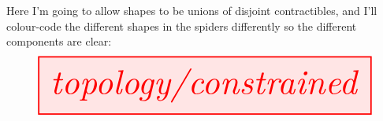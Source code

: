 \begin{example}
Here I'm going to allow shapes to be unions of disjoint contractibles, and I'll colour-code the different shapes in the spiders differently so the different components are clear:
\[\resizebox{\textwidth}{!}{\tikzfig{topology/constrained}}\]
\end{example}